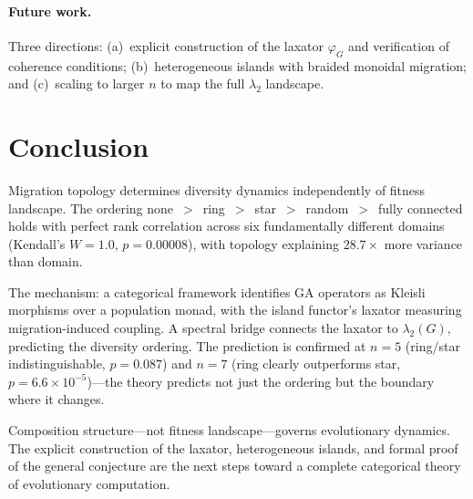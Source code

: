 \documentclass[submission,copyright,creativecommons]{eptcs}
\begin{document}
\paragraph{Future work.}
Three directions: (a)~explicit construction of the laxator
$\varphi_G$ and verification of coherence conditions;
(b)~heterogeneous islands with braided monoidal migration; and
(c)~scaling to larger $n$ to map the full $\lambda_2$ landscape.

\section{Conclusion}
\label{sec:conclusion}

Migration topology determines diversity dynamics independently of
fitness landscape. The ordering
none~$>$~ring~$>$~star~$>$~random~$>$~fully connected holds with
perfect rank correlation across six fundamentally different
domains (Kendall's $W = 1.0$, $p = 0.00008$), with topology
explaining $28.7\times$ more variance than domain.

The mechanism: a categorical framework identifies GA operators as
Kleisli morphisms over a population monad, with the island functor's
laxator measuring migration-induced coupling. A spectral bridge
connects the laxator to $\lambda_2(G)$, predicting the diversity
ordering. The prediction is confirmed at $n{=}5$ (ring/star
indistinguishable, $p = 0.087$) and $n{=}7$ (ring clearly
outperforms star, $p = 6.6 \times 10^{-5}$)---the theory predicts
not just the ordering but the boundary where it changes.

Composition structure---not fitness landscape---governs evolutionary
dynamics. The explicit construction of the laxator, heterogeneous
islands, and formal proof of the general conjecture are the next
steps toward a complete categorical theory of evolutionary
computation.

{\small


}
\end{document}
